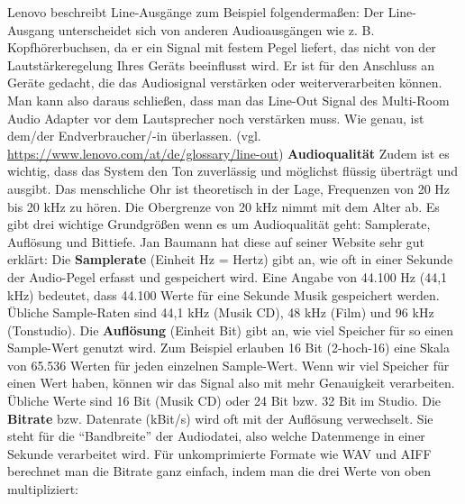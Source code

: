 \documentclass[11pt, twoside]{article}
\begin{document}
Lenovo beschreibt Line-Ausgänge zum Beispiel folgendermaßen: \glqq Der Line-Ausgang unterscheidet sich von anderen Audioausgängen wie z. B. Kopfhörerbuchsen, da er ein Signal mit festem Pegel liefert, das nicht von der Lautstärkeregelung Ihres Geräts beeinflusst wird. Er ist für den Anschluss an Geräte gedacht, die das Audiosignal verstärken oder weiterverarbeiten können.\grqq{} \newline
Man kann also daraus schließen, dass man das Line-Out Signal des Multi-Room Audio Adapter vor dem Lautsprecher noch verstärken muss. Wie genau, ist dem/der Endverbraucher/-in überlassen.
\vspace{4mm} \newline
(vgl. \url{https://www.lenovo.com/at/de/glossary/line-out})
\vspace{4mm}\newline
\textbf{Audioqualität}\newline
Zudem ist es wichtig, dass das System den Ton zuverlässig und möglichst flüssig überträgt und ausgibt.\newline
\glqq Das menschliche Ohr ist theoretisch in der Lage, Frequenzen von 20 Hz bis 20 kHz zu hören. Die
Obergrenze von 20 kHz nimmt mit dem Alter ab. \grqq{} \newline
Es gibt drei wichtige Grundgrößen wenn es um Audioqualität geht: Samplerate, Auflösung und Bittiefe. Jan Baumann hat diese auf seiner Website sehr gut erklärt:
\vspace{4mm}\newline
\glqq Die \textbf{Samplerate} (Einheit Hz = Hertz) gibt an, wie oft in einer Sekunde der Audio-Pegel erfasst und gespeichert wird. Eine Angabe von 44.100 Hz (44,1 kHz) bedeutet, dass 44.100 Werte für eine Sekunde Musik gespeichert werden. Übliche Sample-Raten sind 44,1 kHz (Musik CD), 48 kHz (Film) und 96 kHz (Tonstudio). \grqq{}
\vspace{4mm}\newline
\glqq Die \textbf{Auflösung} (Einheit Bit) gibt an, wie viel Speicher für so einen Sample-Wert genutzt wird. Zum Beispiel erlauben 16 Bit (2-hoch-16) eine Skala von 65.536 Werten für jeden einzelnen Sample-Wert. Wenn wir viel Speicher für einen Wert haben, können wir das Signal also mit mehr Genauigkeit verarbeiten. Übliche Werte sind 16 Bit (Musik CD) oder 24 Bit bzw. 32 Bit im Studio.\grqq{}
\vspace{4mm}\newline
\glqq Die \textbf{Bitrate} bzw. Datenrate (kBit/s) wird oft mit der Auflösung verwechselt. Sie steht für die “Bandbreite” der Audiodatei, also welche Datenmenge in einer Sekunde verarbeitet wird. Für unkomprimierte Formate wie WAV und AIFF berechnet man die Bitrate ganz einfach, indem man die drei Werte von oben multipliziert: \grqq{}\newline
\end{document}
